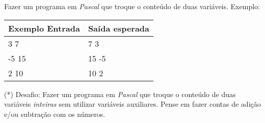 \item Fazer um programa em \emph{Pascal} que troque o conteúdo de duas 
variáveis. Exemplo:

\begin{center}
\begin{tabular}{|l|l|} \hline
Exemplo Entrada & Saída esperada \\ \hline
3 7             & 7 3            \\ \hline
-5 15           & 15 -5          \\ \hline
2 10            & 10 2           \\ \hline
\end{tabular}
\end{center}

\item (*) Desafio:
Fazer um programa em \emph{Pascal}
que troque o conteúdo de duas variáveis \emph{inteiras}
sem utilizar variáveis auxiliares. Pense em fazer contas
de adição e/ou subtração com os números. 


